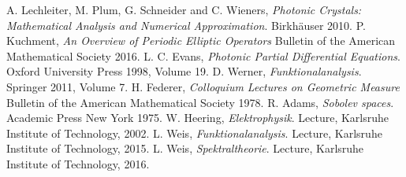 \begin{thebibliography}{00}
   A. Lechleiter, M. Plum, G. Schneider and C. Wieners, {\it Photonic Crystals: Mathematical Analysis and Numerical Approximation}. Birkh{\"a}user 2010.
   P. Kuchment, {\it An Overview of Periodic Elliptic Operators} Bulletin of the American Mathematical Society 2016.
   L. C. Evans, {\it Photonic Partial Differential Equations}. Oxford University Press 1998, Volume 19.
   D. Werner, {\it Funktionalanalysis}. Springer 2011, Volume 7.
   H. Federer, {\it Colloquium Lectures on Geometric Measure} Bulletin of the American Mathematical Society 1978.
   R. Adams, {\it Sobolev spaces}. Academic Press New York 1975.
   W. Heering, {\it Elektrophysik}. Lecture, Karlsruhe Institute of Technology, 2002.
   L. Weis, {\it Funktionalanalysis}. Lecture, Karlsruhe Institute of Technology, 2015.
   L. Weis, {\it Spektraltheorie}. Lecture, Karlsruhe Institute of Technology, 2016.
\end{thebibliography}
